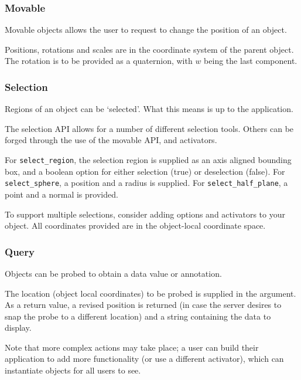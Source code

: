 \documentclass[11pt, oneside]{amsart}
\begin{document}
\subsubsection{Movable}

Movable objects allows the user to request to change the position of an object.



Positions, rotations and scales are in the coordinate system of the parent object. The rotation is to be provided as a quaternion, with $w$ being the last component.

\subsubsection{Selection}

Regions of an object can be `selected'. What this means is up to the application.



The selection API allows for a number of different selection tools. Others can be forged through the use of the movable API, and activators.

For \texttt{select\_region}, the selection region is supplied as an axis aligned bounding box, and a boolean option for either selection (true) or deselection (false). For \texttt{select\_sphere}, a position and a radius is supplied. For \texttt{select\_half\_plane}, a point and a normal is provided.

To support multiple selections, consider adding options and activators to your object. All coordinates provided are in the object-local coordinate space.

\subsubsection{Query}
Objects can be probed to obtain a data value or annotation.



The location (object local coordinates) to be probed is supplied in the argument. As a return value, a revised position is returned (in case the server desires to snap the probe to a different location) and a string containing the data to display.

Note that more complex actions may take place; a user can build their application to add more functionality (or use a different activator), which can instantiate objects for all users to see.
\end{document}
